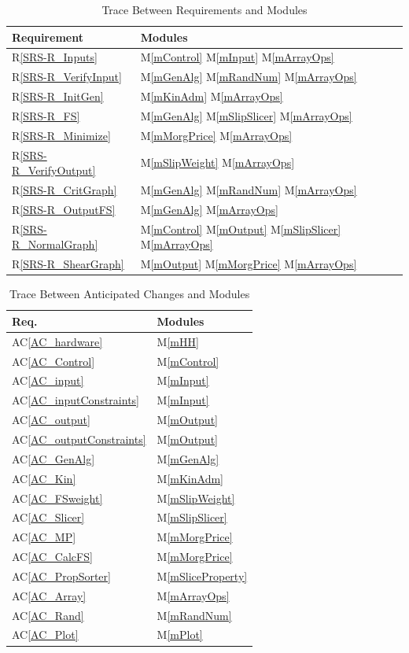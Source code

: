 \documentclass[12pt, titlepage]{article}
\newcommand{\acref}[1]{AC\ref{#1}}
\newcommand{\rref}[1]{R\ref{#1}}
\newcommand{\mref}[1]{M\ref{#1}}
\begin{document}
\begin{table}[h!]
\centering
\begin{tabular}{ll}
\toprule
\textbf{Requirement} & \textbf{Modules}\\
\midrule
\rref{SRS-R_Inputs} & \mref{mControl} \mref{mInput} \mref{mArrayOps}\\
\rref{SRS-R_VerifyInput} & \mref{mGenAlg} \mref{mRandNum} \mref{mArrayOps}\\
\rref{SRS-R_InitGen} & \mref{mKinAdm} \mref{mArrayOps}\\
\rref{SRS-R_FS} & \mref{mGenAlg} \mref{mSlipSlicer} \mref{mArrayOps}\\
\rref{SRS-R_Minimize} & \mref{mMorgPrice} \mref{mArrayOps}\\
\rref{SRS-R_VerifyOutput} & \mref{mSlipWeight} \mref{mArrayOps}\\
\rref{SRS-R_CritGraph} & \mref{mGenAlg} \mref{mRandNum} \mref{mArrayOps}\\
\rref{SRS-R_OutputFS} & \mref{mGenAlg} \mref{mArrayOps}\\
\rref{SRS-R_NormalGraph} & \mref{mControl} \mref{mOutput} \mref{mSlipSlicer} 
\mref{mArrayOps}\\
\rref{SRS-R_ShearGraph} & \mref{mOutput} \mref{mMorgPrice} \mref{mArrayOps}\\
\bottomrule
\end{tabular}
\caption{Trace Between Requirements and Modules}
\label{Table:Req}
\end{table}

\begin{table}[h!]
\centering
\begin{tabular}{ll}
\toprule
\textbf{Req.} & \textbf{Modules}\\
\midrule
\acref{AC_hardware} & \mref{mHH}\\
\acref{AC_Control} & \mref{mControl}\\
\acref{AC_input} & \mref{mInput}\\
\acref{AC_inputConstraints} & \mref{mInput}\\
\acref{AC_output}& \mref{mOutput}\\
\acref{AC_outputConstraints}& \mref{mOutput}\\
\acref{AC_GenAlg}& \mref{mGenAlg}\\
\acref{AC_Kin}& \mref{mKinAdm}\\
\acref{AC_FSweight}& \mref{mSlipWeight}\\
\acref{AC_Slicer} & \mref{mSlipSlicer}\\
\acref{AC_MP} & \mref{mMorgPrice}\\
\acref{AC_CalcFS} & \mref{mMorgPrice}\\
\acref{AC_PropSorter}& \mref{mSliceProperty}\\
\acref{AC_Array} & \mref{mArrayOps}\\
\acref{AC_Rand} & \mref{mRandNum}\\
\acref{AC_Plot} & \mref{mPlot}\\
\bottomrule
\end{tabular}
\caption{Trace Between Anticipated Changes and Modules}
\label{Table:AC}
\end{table}
\end{document}
